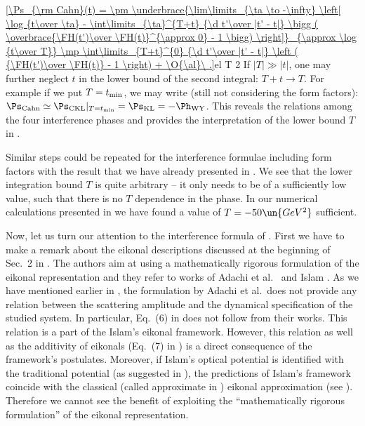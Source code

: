 \eqref{\Ps_{\rm Cahn}(t) =
\pm \underbrace{\lim\limits_{\ta \to -\infty} \left[
	\log {t\over \ta}
	- \int\limits_{\ta}^{T+t} {\d t'\over |t' - t|} \bigg ( \overbrace{\FH(t')\over \FH(t)}^{\approx 0} - 1 \bigg)
\right]}_{\approx \log {t\over T}}
\mp \int\limits_{T+t}^{0} {\d t'\over |t' - t|} \left ( {\FH(t')\over \FH(t)} - 1 \right)
+ \O{\al}\ .}{el T 2}
If $|T| \gg |t|$, one may further neglect $t$ in the lower bound of the second integral: $T+t\rightarrow T$. For example if we put $T=t_{\rm min}$, we may write (still not considering the form factors): $\Ps_{\rm Cahn} \simeq \Ps_{\rm CKL}|_{T=t_{\rm min}} = \Ps_{\rm KL} = - \Ph_{\rm WY}$. This reveals the relations among the four interference phases and provides the interpretation of the lower bound $T$ in .

Similar steps could be repeated for the interference formulae including form factors with the result that we have already presented in . We see that the lower integration bound $T$ is quite arbitrary -- it only needs to be of a sufficiently low value, such that there is no $T$ dependence in the phase. In our numerical calculations presented in  we have found a value of $T=-50\un{GeV^2}$ sufficient.


Now, let us turn our attention to the interference formula of \KaL{}. First we have to make a remark about the eikonal descriptions discussed at the beginning of Sec.~2 in . The authors aim at using a mathematically rigorous formulation of the eikonal representation and they refer to works of Adachi et al.~ and Islam . As we have mentioned earlier in , the formulation by Adachi et al.~does not provide any relation between the scattering amplitude and the dynamical specification of the studied system. In particular, Eq.~(6) in  does not follow from their works. This relation is a part of the Islam's eikonal framework. However, this relation as well as the additivity of eikonals (Eq.~(7) in ) is a direct consequence of the framework's postulates. Moreover, if Islam's optical potential is identified with the traditional potential (as suggested in ), the predictions of Islam's framework coincide with the classical (called approximate in ) eikonal approximation (see ). Therefore we cannot see the benefit of exploiting the ``mathematically rigorous formulation'' of the eikonal representation.

